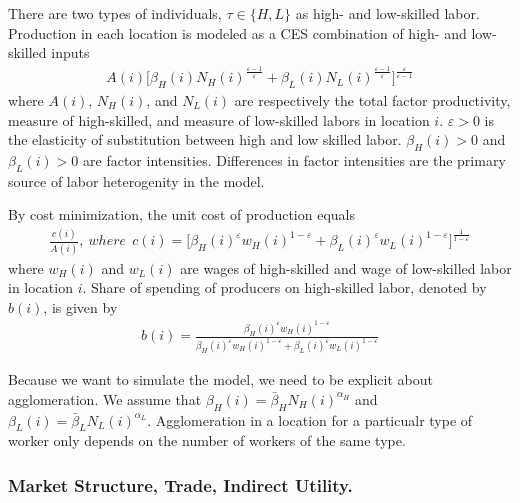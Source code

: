 \documentclass{article}
\begin{document}
There are two types of individuals, $\tau \in \{H,L\}$ as high- and low-skilled labor. Production in each location is modeled as a CES combination of high- and low-skilled inputs
\begin{eqnarray}
	 A(i)\Big[ \beta_H(i) N_H(i)^{\frac{\varepsilon-1}{\varepsilon}} + \beta_L(i) N_L(i)^{\frac{\varepsilon-1}{\varepsilon}} \Big]^{\frac{\varepsilon}{\varepsilon-1}} \nonumber
\end{eqnarray}
where $A(i)$, $N_H(i)$, and $N_L(i)$ are respectively the total factor productivity, measure of high-skilled, and measure of low-skilled labors in location $i$. $\varepsilon>0$ is the elasticity of substitution between high and low skilled labor. $\beta_H(i)>0$ and $\beta_L(i)>0$ are factor intensities. Differences in factor intensities are the primary source of labor heterogenity in the model.  

By cost minimization, the unit cost of production equals
\begin{eqnarray}
    \label{eq:homo_cost_min}
	 \frac{c(i)}{A(i)} ,~where~~c(i)=\Big[ \beta_H(i)^{\varepsilon} w_H(i)^{1-\varepsilon} + \beta_L(i)^{\varepsilon} w_L(i)^{1-\varepsilon}\Big]^{\frac{1}{1-\varepsilon}}
\end{eqnarray}
where $w_H(i)$ and $w_L(i)$ are wages of high-skilled and wage of low-skilled labor in location $i$. 
Share of spending of producers on high-skilled labor, denoted by $b(i)$, is given by
\begin{eqnarray}
    \label{eq:def_b}
	b(i) = \frac{\beta_H(i)^{\varepsilon} w_H(i)^{1-\varepsilon}}{\beta_H(i)^{\varepsilon} w_H(i)^{1-\varepsilon} + \beta_L(i)^{\varepsilon} w_L(i)^{1-\varepsilon}}
\end{eqnarray}

Because we want to simulate the model, we need to be explicit about agglomeration.  We  assume that $\beta_H(i)=\bar{\beta}_H N_H(i)^{\alpha_H}$ and $\beta_L(i) = \bar{\beta}_L N_L(i)^{\alpha_L}$.  Agglomeration in a location for a particualr type of worker only depends on the number of workers of the same type.

\subsubsection{Market Structure, Trade, Indirect Utility.}
\end{document}
